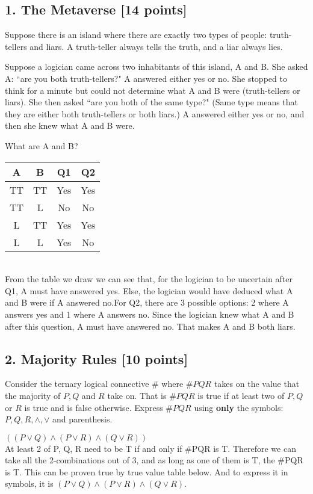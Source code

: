 \documentclass[12pt]{exam}
\begin{document}
\begin{solution}
\subsection* {1. The Metaverse [14 points]}
Suppose there is an island where there are exactly two types of people: truth-tellers and liars. A truth-teller always tells the truth, and a liar always lies.

Suppose a logician came across two inhabitants of this island, A and B. She asked A: ``are you both truth-tellers?" A answered either yes or no. She stopped to think for a minute but could not determine what A and B were (truth-tellers or liars). She then asked ``are you both of the same type?" (Same type means that they are either both truth-tellers or both liars.) A answered either yes or no, and then she knew what A and B were.

What are A and B?

\begin{solution}
 \begin{tabular}{c|c|c|c}
    A & B & Q1 & Q2 \\
    \hline
    TT & TT & Yes & Yes\\
    TT & L & No & No\\
    L & TT & Yes & Yes\\
    L & L & Yes & No\\
\end{tabular} \\
From the table we draw we can see that, for the logician to be uncertain after Q1, A must have answered yes. Else, the logician would have deduced what A and B were if A answered no.For Q2, there are 3 possible options: 2 where A answers yes and 1 where A answers no. Since the logician knew what A and B after this question, A must have answered no. That makes A and B both liars.
\end{solution}

\subsection*{2. Majority Rules [10 points]}
Consider the ternary logical connective $\#$ where $\#PQR$ takes on the value that the majority of $P, Q$ and $R$ take on. That is $\#PQR$ is true if at least two of $P,Q$ or $R$ is true and is false otherwise. Express $\#PQR$ using \textbf{only} the symbols: $P, Q, R, \land, \lor$ and parenthesis.

\begin{solution} 
$(( P \lor Q) \land (P \lor R) \land (Q \lor R))$ \\
At least 2 of P, Q, R need to be T if and only if \#PQR is T. Therefore we can take all the 2-combinations out of 3, and as long as one of them is T, the \#PQR is T. This can be proven true by true value table below. And to express it in symbols, it is $( P \lor Q) \land (P \lor R) \land (Q \lor R)$. \\


\end{solution}
\end{solution}
\end{document}
